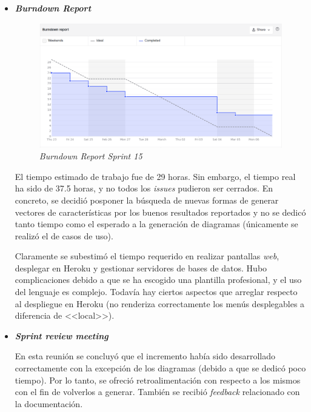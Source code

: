 \begin{itemize}
	\item \textbf{\textit{Burndown Report}}
	
	\begin{figure}[h]
		\caption[\textit{Sprint} 15: \textit{burndown report}]{\textit{Burndown Report Sprint 15}}
		\centering
		\includegraphics[width=\textwidth]{../img/anexos/bdr/s15_bdr}
	\end{figure}
	
	El tiempo estimado de trabajo fue de 29 horas. Sin embargo, el tiempo real ha sido de 37.5 horas, y no todos los \textit{issues} pudieron ser cerrados. En concreto, se decidió posponer la búsqueda de nuevas formas de generar vectores de características por los buenos resultados reportados y no se dedicó tanto tiempo como el esperado a la generación de diagramas (únicamente se realizó el de casos de uso).
	
	Claramente se subestimó el tiempo requerido en realizar pantallas \textit{web}, desplegar en Heroku y gestionar servidores de bases de datos. Hubo complicaciones debido a que se ha escogido una plantilla profesional, y el uso del lenguaje es complejo. Todavía hay ciertos aspectos que arreglar respecto al despliegue en Heroku (no renderiza correctamente los menús desplegables a diferencia de <<local>>).
	
	\item \textbf{\textit{Sprint review meeting}}
	
	En esta reunión se concluyó que el incremento había sido desarrollado correctamente con la excepción de los diagramas (debido a que se dedicó poco tiempo). Por lo tanto, se ofreció retroalimentación con respecto a los mismos con el fin de volverlos a generar. También se recibió \textit{feedback} relacionado con la documentación.
\end{itemize}


